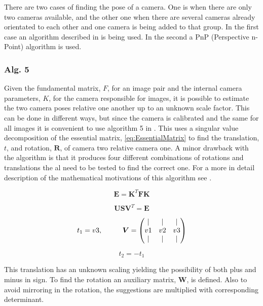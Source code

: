 There are two cases of finding the pose of a camera. One is when there are only two cameras available, and the other one when there are several cameras already orientated to each other and one camera is being added to that group. In the first case an algorithm described in \cite{Klas} is being used. In the second a PnP (Perspective n-Point) algorithm is used.

\subsubsection{Alg. 5}
Given the fundamental matrix, $F$, for an image pair and the internal camera parameters, $K$, for the camera responsible for images, it is possible to estimate the two camera poses relative one another up to an unknown scale factor. This can be done in different ways, but since the camera is calibrated and the same for all images it is convenient to use algorithm 5 in \cite{Klas}. This uses a singular value decomposition of the essential matrix, \eqref{eq:EssentialMatrix} to find the translation, $t$, and rotation, $\boldsymbol{R}$, of camera two relative camera one. A minor drawback with the algorithm is that it produces four different combinations of rotations and translations the al need to be tested to find the correct one. For a more in detail description of the mathematical motivations of this algorithm see \cite{Klas}. 

\begin{equation}
\label{eq:EssentialMatrix}
\boldsymbol{E} = \boldsymbol{K}^T \boldsymbol{FK}
\end{equation}

\begin{equation}
\boldsymbol{U S V}^T = \boldsymbol{E}
\end{equation}

\begin{equation}
t_1 = v3, \hspace{1 cm}  \boldsymbol{V} = \begin{pmatrix}
										 |  & |  & |  \\
										 v1 & v2 & v3 \\
										 |  & |  & |
										\end{pmatrix}
\end{equation}

\begin{equation}
t_2 = -t_1
\end{equation}

This translation has an unknown scaling yielding the possibility of both plus and minus in sign. To find the rotation an auxiliary matrix, $\boldsymbol{W}$, is defined. Also to avoid mirroring in the rotation, the suggestions are multiplied with corresponding determinant.

